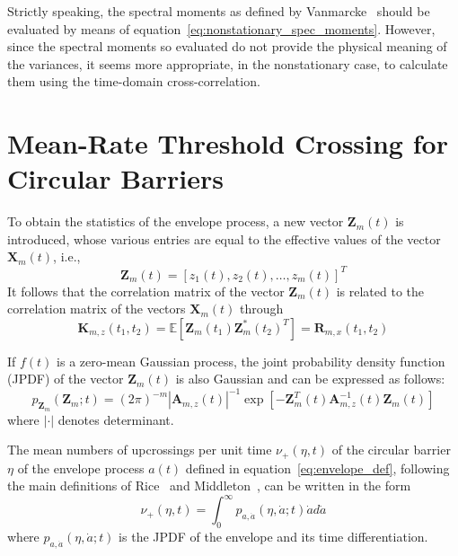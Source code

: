 \documentclass[12pt]{article}
\begin{document}
Strictly speaking, the spectral moments as defined by Vanmarcke~\cite{vanmarcke1972, vanmarcke1975} should be evaluated by means of equation~\eqref{eq:nonstationary_spec_moments}. However, since the spectral moments so evaluated do not provide the physical meaning of the variances, it seems more appropriate, in the nonstationary case, to calculate them using the time-domain cross-correlation.

\section{Mean-Rate Threshold Crossing for Circular Barriers}
To obtain the statistics of the envelope process, a new vector $\mathbf{Z}_m(t)$ is introduced, whose various entries are equal to the effective values of the vector $\mathbf{X}_m(t)$, i.e.,
\begin{equation}
    \mathbf{Z}_m(t) = \left[ z_1(t), z_2(t), \ldots, z_m(t) \right]^T
    \label{eq:Zm_def}
\end{equation}
It follows that the correlation matrix of the vector $\mathbf{Z}_m(t)$ is related to the correlation matrix of the vectors $\mathbf{X}_m(t)$ through
\begin{equation}
    \mathbf{K}_{m,z}(t_1, t_2) = \mathbb{E} \left[ \mathbf{Z}_m(t_1) \mathbf{Z}_m^*(t_2)^T \right] = \mathbf{R}_{m,x}(t_1, t_2)
    \label{eq:K_mz}
\end{equation}

If $f(t)$ is a zero-mean Gaussian process, the joint probability density function (JPDF) of the vector $\mathbf{Z}_m(t)$ is also Gaussian and can be expressed as follows:
\begin{equation}
    p_{\mathbf{Z}_m}(\mathbf{Z}_m; t) = (2\pi)^{-m} |\mathbf{A}_{m,z}(t)|^{-1} \exp\left[ -\mathbf{Z}_m^T(t) \mathbf{A}_{m,z}^{-1}(t) \mathbf{Z}_m(t) \right]
    \label{eq:jpdf_Zm}
\end{equation}
where $|\cdot|$ denotes determinant.

The mean numbers of upcrossings per unit time $\nu_+(\eta, t)$ of the circular barrier $\eta$ of the envelope process $a(t)$ defined in equation~\eqref{eq:envelope_def}, following the main definitions of Rice~\cite{rice1955} and Middleton~\cite{middleton1960}, can be written in the form
\begin{equation}
    \nu_+(\eta, t) = \int_0^{\infty} p_{a,\dot{a}}(\eta, \dot{a}; t) \dot{a} d\dot{a}
    \label{eq:mean_upcrossings}
\end{equation}
where $p_{a,\dot{a}}(\eta, \dot{a}; t)$ is the JPDF of the envelope and its time differentiation.
\end{document}
